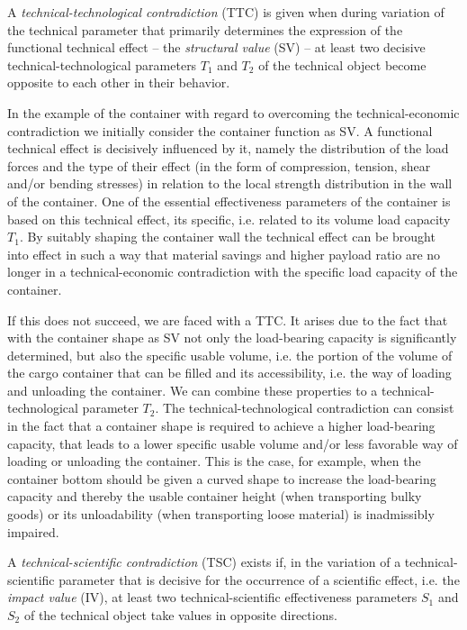 \documentclass[11pt,a4paper]{article}
\begin{document}
A \emph{technical-technological contradiction} (TTC) is given when during
variation of the technical parameter that primarily determines the expression
of the functional technical effect -- the \emph{structural value} (SV) -- at
least two decisive technical-technological parameters $T_1$ and $T_2$ of the
technical object become opposite to each other in their behavior.

In the example of the container with regard to overcoming the
technical-economic contradiction we initially consider the container function
as SV.  A functional technical effect is decisively influenced by it, namely
the distribution of the load forces and the type of their effect (in the form
of compression, tension, shear and/or bending stresses) in relation to the
local strength distribution in the wall of the container. One of the essential
effectiveness parameters of the container is based on this technical effect,
its specific, i.e. related to its volume load capacity $T_1$. By suitably
shaping the container wall the technical effect can be brought into effect in
such a way that material savings and higher payload ratio are no longer in a
technical-economic contradiction with the specific load capacity of the
container.

If this does not succeed, we are faced with a TTC.  It arises due to the fact
that with the container shape as SV not only the load-bearing capacity is
significantly determined, but also the specific usable volume, i.e.  the
portion of the volume of the cargo container that can be filled and its
accessibility, i.e. the way of loading and unloading the container. We can
combine these properties to a technical-technological parameter $T_2$. The
technical-technological contradiction can consist in the fact that a container
shape is required to achieve a higher load-bearing capacity, that leads to a
lower specific usable volume and/or less favorable way of loading or unloading
the container. This is the case, for example, when the container bottom should
be given a curved shape to increase the load-bearing capacity and thereby the
usable container height (when transporting bulky goods) or its unloadability
(when transporting loose material) is inadmissibly impaired.

A \emph{technical-scientific contradiction} (TSC) exists if, in the variation
of a technical-scientific parameter that is decisive for the occurrence of a
scientific effect, i.e. the \emph{impact value} (IV), at least two
technical-scientific effectiveness parameters $S_1$ and $S_2$ of the technical
object take values in opposite directions.
\end{document}
